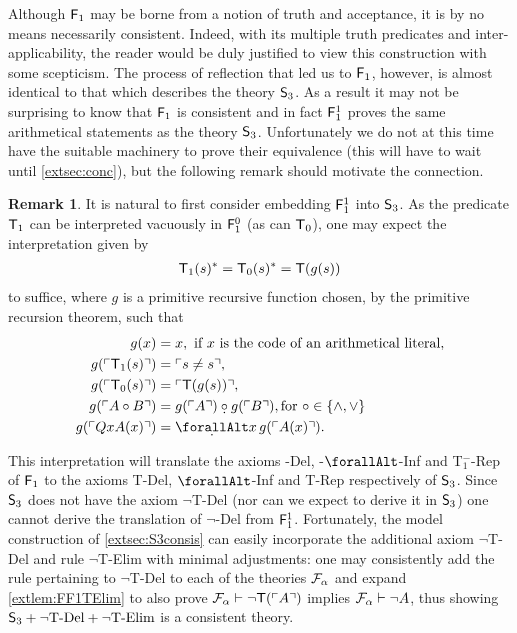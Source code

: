 \documentclass[UKenglish,cleveref,DIV=12]{scrartcl}
\let\forall\forallAlt
\theoremstyle{definition}
\theoremstyle{definition}
\newtheorem{remark}{Remark}
\begin{document}
Although $\mathsf{F}_1$ may be borne from a notion of
truth and acceptance, it is by no means necessarily consistent.
Indeed, with its multiple
truth predicates and inter-applicability, the reader would be duly justified to
view this construction with some scepticism. The process of reflection that led
us to $\mathsf{F}_1$, however, is almost identical to that which describes the theory
$\mathsf{S}_3$. As a result it may not be surprising to know that $\mathsf{F}_1$ is
consistent and in fact $\mathsf{F}_1^1$ proves the same arithmetical statements as the
theory $\mathsf{S}_3$. Unfortunately we do not at this time have the suitable
machinery to prove their equivalence ({this will have to wait until
\cref{extsec:conc}}), but the
following remark should motivate the connection.


\begin{remark}\label{extrem:S3} It is natural to first consider embedding
$\mathsf{F}_1^1$ into $\mathsf{S}_3$. As the predicate $\mathsf{T}_1$ can be interpreted vacuously
in $\mathsf{F}_1^0$ (as can $\mathsf{T}_0$), one may expect the interpretation given by
\begin{align*}
 \mathsf{T}_1(s)^*=\mathsf{T}_0(s)^*= \mathsf{T}(g(s))
\end{align*}
to suffice, where $g$ is a primitive recursive function chosen, by the primitive recursion theorem, such that
\begin{align*}
 g(x)&=x, \text{ if $x$ is the code of an arithmetical literal},\\
 g(\gn{\T_1(s)})&=\gn{s\neq s},\\
 g(\gn{\T_0(s)})&=\gn{\T(g(s))},\\
 g(\gn{A\mathbin\circ B})&=g(\gn A)\mathbin{\subdot\circ} g(\gn B), \text{for $\circ\in\{\land,\lor\}$}\\
 g(\gn{QxA(x)})&=\dfa x\, g(\gn{A(x)}).
\end{align*}

This interpretation will translate the axioms -Del, -$\forall$-Inf
and T$_1^-$-Rep of $\mathsf{F}_1$ to the axioms T-Del, $\forall$-Inf and T-Rep
respectively of $\mathsf{S}_3$. Since $\mathsf{S}_3$ does not have the axiom
$\lnot$T-Del (nor can we expect to derive it in $\mathsf{S}_3$) one cannot derive
the translation of $\lnot$-Del from $\mathsf{F}_1^1$. Fortunately, the model
construction of \cref{extsec:S3consis} can easily incorporate the additional
axiom $\lnot$T-Del and rule $\lnot$T-Elim with minimal adjustments: one
may consistently add the rule pertaining to $\lnot$T-Del to each of the theories
$\mathcal{F}_\alpha$ and expand \cref{extlem:FF1TElim} to also prove $\mathcal{F}_\alpha\vdash\lnot
\mathsf{T}(\ulcorner{A}\urcorner)$ implies $\mathcal{F}_\alpha\vdash\lnot A$, thus showing $\mathsf{S}_3+\text{$\lnot$T-Del}+\text{$\lnot$T-Elim}$ is a consistent theory.


\end{remark}
\end{document}
